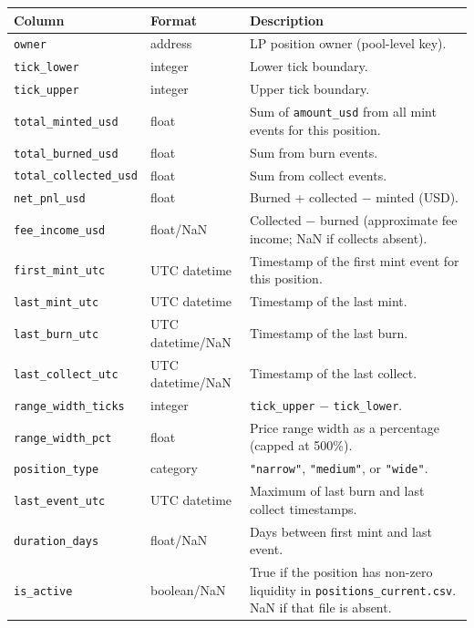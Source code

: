 \documentclass[11pt,a4paper]{article}
\begin{document}
\begin{xltabular}{\linewidth}{L{4.5cm}L{3.0cm}Y}
\toprule
\textbf{Column} & \textbf{Format} & \textbf{Description} \\
\midrule
\texttt{owner} & address & LP position owner (pool-level key). \\
\texttt{tick\_lower} & integer & Lower tick boundary. \\
\texttt{tick\_upper} & integer & Upper tick boundary. \\
\texttt{total\_minted\_usd} & float & Sum of \texttt{amount\_usd} from
  all mint events for this position. \\
\texttt{total\_burned\_usd} & float & Sum from burn events. \\
\texttt{total\_collected\_usd} & float & Sum from collect events. \\
\texttt{net\_pnl\_usd} & float & Burned + collected $-$ minted (USD). \\
\texttt{fee\_income\_usd} & float/NaN & Collected $-$ burned (approximate
  fee income; NaN if collects absent). \\
\texttt{first\_mint\_utc} & UTC datetime & Timestamp of the first mint
  event for this position. \\
\texttt{last\_mint\_utc} & UTC datetime & Timestamp of the last mint. \\
\texttt{last\_burn\_utc} & UTC datetime/NaN & Timestamp of the last burn. \\
\texttt{last\_collect\_utc} & UTC datetime/NaN & Timestamp of the last
  collect. \\
\texttt{range\_width\_ticks} & integer & \texttt{tick\_upper} $-$
  \texttt{tick\_lower}. \\
\texttt{range\_width\_pct} & float & Price range width as a percentage
  (capped at 500\%). \\
\texttt{position\_type} & category & \texttt{"narrow"}, \texttt{"medium"},
  or \texttt{"wide"}. \\
\texttt{last\_event\_utc} & UTC datetime & Maximum of last burn and last
  collect timestamps. \\
\texttt{duration\_days} & float/NaN & Days between first mint and last
  event. \\
\texttt{is\_active} & boolean/NaN & True if the position has non-zero
  liquidity in \texttt{positions\_current.csv}. NaN if that file is
  absent. \\
\bottomrule
\end{xltabular}
\end{document}
